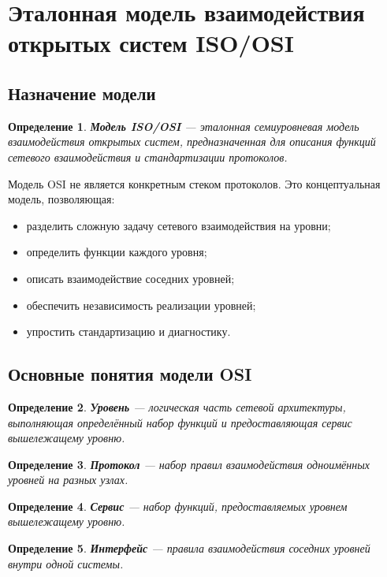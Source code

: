 \documentclass[12pt,a4paper]{article}
\newtheorem{definition}{Определение}
\begin{document}
\section{Эталонная модель взаимодействия открытых систем ISO/OSI}

\subsection{Назначение модели}

\begin{definition}
\textbf{Модель ISO/OSI} --- эталонная семиуровневая модель взаимодействия открытых систем, предназначенная для описания функций сетевого взаимодействия и стандартизации протоколов.
\end{definition}

Модель OSI не является конкретным стеком протоколов. Это концептуальная модель, позволяющая:
\begin{itemize}
    \item разделить сложную задачу сетевого взаимодействия на уровни;
    \item определить функции каждого уровня;
    \item описать взаимодействие соседних уровней;
    \item обеспечить независимость реализации уровней;
    \item упростить стандартизацию и диагностику.
\end{itemize}

\subsection{Основные понятия модели OSI}

\begin{definition}
\textbf{Уровень} --- логическая часть сетевой архитектуры, выполняющая определённый набор функций и предоставляющая сервис вышележащему уровню.
\end{definition}

\begin{definition}
\textbf{Протокол} --- набор правил взаимодействия одноимённых уровней на разных узлах.
\end{definition}

\begin{definition}
\textbf{Сервис} --- набор функций, предоставляемых уровнем вышележащему уровню.
\end{definition}

\begin{definition}
\textbf{Интерфейс} --- правила взаимодействия соседних уровней внутри одной системы.
\end{definition}
\end{document}
